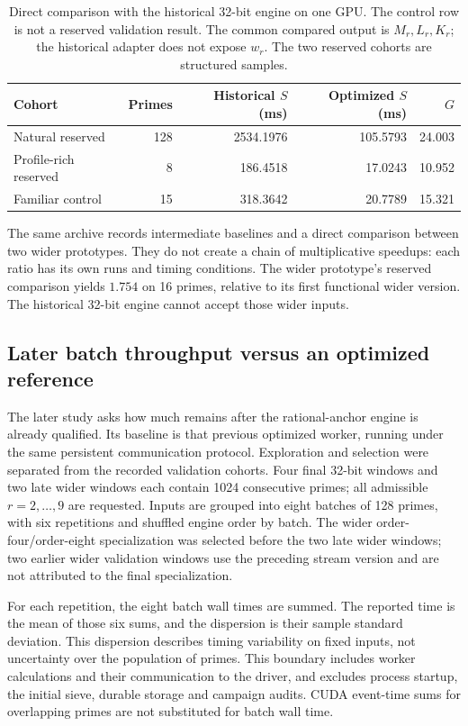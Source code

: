\documentclass[11pt]{article}
\theoremstyle{definition}\newtheorem{remark}[theorem]{Remark}
\begin{document}
\begin{table}[ht]
\centering\small
\begin{tabular}{lrrrr}
\toprule
Cohort & Primes & Historical $S$ (ms) & Optimized $S$ (ms) & $G$\\
\midrule
Natural reserved &128&2534.1976&105.5793&24.003\\
Profile-rich reserved &8&186.4518&17.0243&10.952\\
Familiar control &15&318.3642&20.7789&15.321\\
\bottomrule
\end{tabular}
\caption{Direct comparison with the historical 32-bit engine on one GPU.
The control row is not a reserved validation result. The common compared output is $M_r,L_r,K_r$; the historical adapter
does not expose $w_r$. The two reserved cohorts are structured samples.}
\label{tab:historical}
\end{table}

The same archive records intermediate baselines and a direct comparison
between two wider prototypes. They do not create a chain of multiplicative
speedups: each ratio has its own runs and timing conditions. The wider
prototype's reserved comparison yields $1.754$ on 16 primes, relative to
its first functional wider version. The historical 32-bit engine cannot
accept those wider inputs.

\subsection{Later batch throughput versus an optimized reference}
The later study asks how much remains after the rational-anchor engine is
already qualified. Its baseline is that previous optimized worker, running
under the same persistent communication protocol. Exploration and selection
were separated from the recorded validation cohorts. Four final 32-bit
windows and two late wider windows each contain 1024 consecutive primes;
all admissible $r=2,\ldots,9$ are requested. Inputs are grouped into eight
batches of 128 primes, with six repetitions and shuffled engine order by
batch. The wider order-four/order-eight specialization was selected before
the two late wider windows; two earlier wider validation windows use the
preceding stream version and are not attributed to the final specialization.

For each repetition, the eight batch wall times are summed. The reported
time is the mean of those six sums, and the dispersion is their sample
standard deviation. This dispersion describes timing variability on fixed
inputs, not uncertainty over the population of primes. This boundary includes worker calculations and their
communication to the driver, and excludes process startup, the initial
sieve, durable storage and campaign audits. CUDA event-time sums for
overlapping primes are not substituted for batch wall time.
\end{document}
